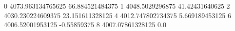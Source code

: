 0 4073.963134765625 66.884521484375
1 4048.5029296875 41.42431640625
2 4030.230224609375 23.151611328125
4 4012.747802734375 5.669189453125
6 4006.52001953125 -0.55859375
8 4007.07861328125 0.0
